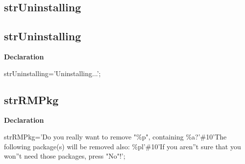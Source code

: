 \documentclass{report}
\newif\ifpdf
\begin{document}
\subsection*{\large{\textbf{strUninstalling}}\normalsize\hspace{1ex}\hrulefill}
\else
\subsection*{strUninstalling}
\fi
\label{trstrings-strUninstalling}
\begin{list}{}{
\setlength{\itemindent}{0cm}
\setlength{\listparindent}{0cm}
\setlength{\leftmargin}{\evensidemargin}
\addtolength{\leftmargin}{\tmplength}
\settowidth{\labelsep}{X}
\addtolength{\leftmargin}{\labelsep}
\setlength{\labelwidth}{\tmplength}
}
\item[\textbf{Declaration}\hfill]
\ifpdf
\begin{flushleft}
\fi
\begin{ttfamily}
strUninstalling='Uninstalling...';\end{ttfamily}

\ifpdf
\end{flushleft}
\fi

\end{list}
\ifpdf
\subsection*{\large{\textbf{strRMPkg}}\normalsize\hspace{1ex}\hrulefill}
\else
\subsection*{strRMPkg}
\fi
\label{trstrings-strRMPkg}
\begin{list}{}{
\setlength{\itemindent}{0cm}
\setlength{\listparindent}{0cm}
\setlength{\leftmargin}{\evensidemargin}
\addtolength{\leftmargin}{\tmplength}
\settowidth{\labelsep}{X}
\addtolength{\leftmargin}{\labelsep}
\setlength{\labelwidth}{\tmplength}
}
\item[\textbf{Declaration}\hfill]
\ifpdf
\begin{flushleft}
\fi
\begin{ttfamily}
strRMPkg='Do you really want to remove "{\%}p", containing {\%}a?'{\#}10'The following package(s) will be removed also: {\%}pl'{\#}10'If you aren''t sure that you won''t need those packages, press "No"!';\end{ttfamily}

\ifpdf
\end{flushleft}
\fi

\end{list}
\ifpdf
\end{document}
